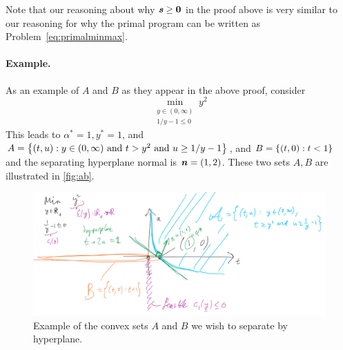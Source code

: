 \begin{remark*}
  Note that our reasoning about why $\boldsymbol{\mathit{s}} \geq \boldsymbol{0}$ in the proof
  above is very similar to our reasoning for why the primal program
  can be written as Problem~\eqref{eq:primalminmax}.
\end{remark*}

\paragraph{Example.}
As an example of $A$ and $B$ as they appear in the above proof,
consider
\[
\min_{\substack{y \in (0,\infty) \\ 1/y
    -1 \leq 0}}
y^2
\]
 This leads to $\alpha^* = 1,
    y^* =1$, and $A = \left\{ (t,u): y \in (0,\infty) \text{ and } t >y^2
       \text{ and } u \geq 1/y-1 \right\}$, and $B = \left\{ (t,0) : t < 1 \right\}$ and the separating hyperplane normal is $\boldsymbol{\mathit{n}} = (1,2)$.
These two sets $A,B$ are illustrated in \autoref{fig:ab}.
\begin{figure}[H]
  \centering
  \includegraphics[width=.9\textwidth]{fig/lec12-the-sets-a-b.jpg}
  \caption{Example of the convex sets $A$ and $B$ we wish to separate by hyperplane.}
\label{fig:ab}
\end{figure}










%


